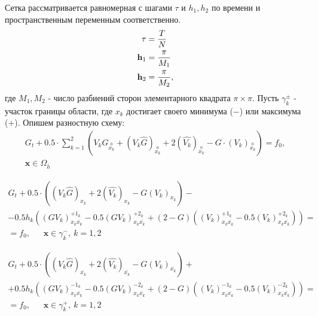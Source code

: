 \documentclass[specialist,subf,href,colorlinks=true,14pt,times,mtpro]{disser}
\def\h{{\bf h}}
\newcommand{\wdrv}[1]{_{\stackrel{0}{#1}}}
\newcommand{\bdrv}[1]{_{\overline{#1}}}
\newcommand{\fdrv}[1]{_{#1}}
\newcommand{\ddrv}[1]{_{#1\overline{#1}}}
\begin{document}
Сетка рассматривается равномерная с шагами $\tau$ и $h_1, h_2$ по времени и пространственным переменным соответственно.
$$
\begin{aligned}
\tau &= \frac{T}{N} \\
\h_1 &= \frac{\pi}{M_1} \\
\h_2 &= \frac{\pi}{M_2}, \\
\end{aligned}
$$
где $M_1, M_2$ - число разбиений сторон элементарного квадрата $\pi \times \pi$. Пусть $\gamma_k^{\pm}$ - участок границы области, где $x_k$ достигает своего минимума ($-$) или максимума ($+$).
Опишем разностную схему:
\newpage
\begin{equation}
\begin{array}{l}
G_t + 0.5 \cdot \sum_{k = 1}^2 \left(V_k \hat{G}\wdrv{x_k} + (V_k \hat{G})\wdrv{x_k} + 2 (\hat{V_k})\wdrv{x_k} - G \cdot (V_k)\wdrv{x_k}\right) = 
f_0, \\
 \textbf{x} \in \Omega\bdrv{h}
\end{array}
\end{equation}

\begin{equation}
\begin{array}{l}
G_t + 0.5 \cdot \left((V_k \hat{G})\fdrv{x_k} + 2(\hat{V_k})\fdrv{x_k} - G(V_k)\fdrv{x_k}\right) - \\
- 0.5h_k \left( (GV_k)\ddrv{x_k}^{+1_k} - 0.5(GV_k)\ddrv{x_k}^{+2_k} + (2 - G)((V_k)\ddrv{x_k}^{+1_k} - 0.5(V_k)\ddrv{x_k}^{+2_k})\right) = \\
= f_0,\ \ \ \ \ \ \ \textbf{x} \in \gamma^{-}_k,\  k = 1, 2
\end{array}
\end{equation}

\begin{equation}
\begin{array}{l}
G_t + 0.5 \cdot \left((V_k \hat{G})\bdrv{x_k} + 2(\hat{V_k})\bdrv{x_k} - G(V_k)\bdrv{x_k}\right) + \\
+ 0.5h_k \left( (GV_k)\ddrv{x_k}^{-1_k} - 0.5(GV_k)\ddrv{x_k}^{-2_k} + (2 - G)((V_k)\ddrv{x_k}^{-1_k} - 0.5(V_k)\ddrv{x_k}^{-2_k})\right) = \\
= f_0,\ \ \ \ \ \ \ \textbf{x} \in \gamma^{+}_k,\  k = 1, 2
\end{array}
\end{equation}
\end{document}
